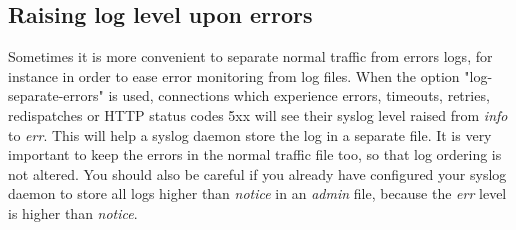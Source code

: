 
\subsection{Raising log level upon errors}

Sometimes it is more convenient to separate normal traffic from errors logs,
for instance in order to ease error monitoring from log files. When the option
"log-separate-errors" is used, connections which experience errors, timeouts,
retries, redispatches or HTTP status codes 5xx will see their syslog level
raised from \emph{info} to \emph{err}. This will help a syslog daemon store the log in
a separate file. It is very important to keep the errors in the normal traffic
file too, so that log ordering is not altered. You should also be careful if
you already have configured your syslog daemon to store all logs higher than
\emph{notice} in an \emph{admin} file, because the \emph{err} level is higher than \emph{notice}.

